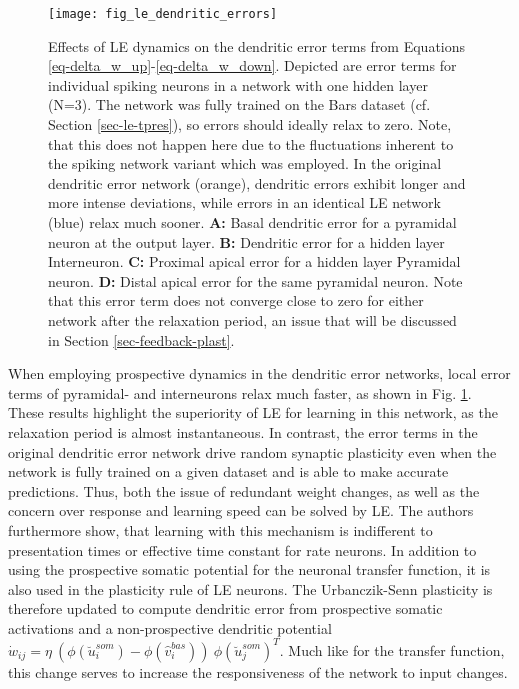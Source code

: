 \begin{figure}[h!]
  \centering
  \texttt{[image: fig\_le\_dendritic\_errors]}
  \caption[Effects of LE dynamics on dendritic error]{Effects of LE dynamics on the dendritic error terms from Equations
    \ref{eq-delta_w_up}-\ref{eq-delta_w_down}. Depicted are error terms for individual spiking neurons in a network with
    one hidden layer (N=3). The network was fully trained on the Bars dataset (cf. Section \ref{sec-le-tpres}), so
    errors should ideally relax to zero. Note, that this does not happen here due to the fluctuations inherent to the
    spiking network variant which was employed. In the original dendritic error network (orange), dendritic errors
    exhibit longer and more intense deviations, while errors in an identical LE network (blue) relax much sooner.
    \textbf{A:} Basal dendritic error for a pyramidal neuron at the output layer. \textbf{B:} Dendritic error for a
    hidden layer Interneuron. \textbf{C:} Proximal apical error for a hidden layer Pyramidal neuron. \textbf{D:} Distal
    apical error for the same pyramidal neuron. Note that this error term does not converge close to zero for either
    network after the relaxation period, an issue that will be discussed in Section \ref{sec-feedback-plast}.}
  \label{fig-error-comp-le}
\end{figure}


When employing prospective dynamics in the dendritic error networks, local error terms of pyramidal- and interneurons
relax much faster, as shown in Fig. \ref{fig-error-comp-le}. These results highlight the superiority of LE for
learning in this network, as the relaxation period is almost instantaneous. In contrast, the error terms in the original
dendritic error network drive random synaptic plasticity even when the network is fully trained on a given dataset and
is able to make accurate predictions. Thus, both the issue of redundant weight changes, as well as the concern over
response and learning speed can be solved by LE. The authors furthermore show, that learning with this mechanism is 
indifferent to presentation times or effective time constant for rate neurons.
In addition to using the prospective somatic potential for the neuronal transfer function, it is also used in the
plasticity rule of LE neurons. The Urbanczik-Senn plasticity is therefore updated to compute dendritic error from
prospective somatic activations and a non-prospective dendritic potential $\dot{w}_{ij}= \eta \ (
\phi(\breve{u}_i^{som}) - \phi(\hat{v}_i^{bas}) ) \ \phi(\breve{u}_j^{som})^T$. Much like for the transfer function,
this change serves to increase the responsiveness of the network to input changes.

